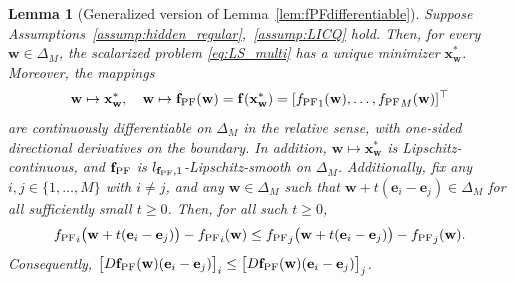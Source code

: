 \documentclass{article}
\newtheorem{lemma}{Lemma}
\newcommand{\bx}{\mathbf{x}}
\newcommand{\bw}{\mathbf{w}}
\newcommand{\be}{\mathbf{e}}
\newcommand{\f}{\mathbf{f}}
\newcommand{\fPF}{{\mathbf{f}_{\rm PF}}}
\begin{document}
\begin{lemma}[Generalized version of Lemma~\ref{lem:fPFdifferentiable}]
\label{lem:fPFdifferentiable_multi}
Suppose Assumptions~\ref{assump:hidden_regular},~\ref{assump:LICQ} hold. Then, for every $\bw\in\Delta_M$, the scalarized problem \eqref{eq:LS_multi} has a unique minimizer $\bx_\bw^*$. Moreover, the mappings
\begin{align}
\bw\mapsto \bx_\bw^*, \quad \bw\mapsto \fPF(\bw)=\f(\bx_\bw^*)=[{f_{\rm PF}}_1(\bw),\dots,{f_{\rm PF}}_M(\bw)]^\top
\end{align}
are continuously differentiable on $\Delta_M$ in the relative sense, with one-sided directional derivatives on the boundary. In addition, $\bw\mapsto \bx_\bw^*$ is Lipschitz-continuous, and $\fPF$ is $l_{\fPF,1}$-Lipschitz-smooth on $\Delta_M$.
Additionally, fix any $i,j\in\{1,\dots,M\}$ with $i\neq j$, and any $\bw\in\Delta_M$ such that $\bw+t(\be_i-\be_j)\in\Delta_M$ for all sufficiently small $t\ge 0$. Then, for all such $t\ge 0$,
\begin{align}
{f_{\rm PF}}_i\bigl(\bw+t(\be_i-\be_j)\bigr)-{f_{\rm PF}}_i(\bw)\le {f_{\rm PF}}_j\bigl(\bw+t(\be_i-\be_j)\bigr)-{f_{\rm PF}}_j(\bw).
\end{align}
Consequently, $\bigl[D\fPF(\bw)(\be_i-\be_j)\bigr]_i\le \bigl[D\fPF(\bw)(\be_i-\be_j)\bigr]_j$.
\end{lemma}
\end{document}
